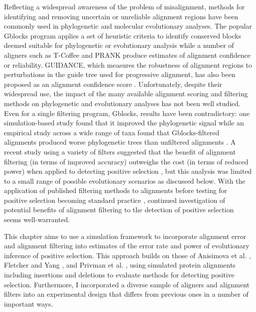 Reflecting a widespread awareness of the problem of misalignment,
methods for identifying and removing uncertain or unreliable alignment
regions have been commonly used in phylogenetic and molecular
evolutionary analyses. The popular Gblocks program applies a set of
heuristic criteria to identify conserved blocks deemed suitable for
phylogenetic or evolutionary analysis \citep{Castresana2000Selection}
while a number of aligners such as T-Coffee
\citep{Notredame2000T} and PRANK
\citep{Loytynoja2008PhylogenyAware} produce estimates of alignment
confidence or reliability. GUIDANCE, which measures the robustness of
alignment regions to perturbations in the guide tree used for
progressive alignment, has also been proposed as an alignment
confidence score \citep{Penn2010Alignment}. Unfortunately, despite
their widespread use, the impact of the many available alignment
scoring and filtering methods on phylogenetic and evolutionary
analyses has not been well studied. Even for a single filtering
program, Gblocks, results have been contradictory: one
simulation-based study found that it improved the phylogenetic signal
\citep{Talavera2007Improvement} while an empirical study across a wide
range of taxa found that Gblocks-filtered alignments produced worse
phylogenetic trees than unfiltered alignments
\citep{Dessimoz2010Phylogenetic}. A recent study using a variety of
filters suggested that the benefit of alignment filtering (in terms of
improved accuracy) outweighs the cost (in terms of reduced power) when
applied to detecting positive selection \citep{Privman2011Improving},
but this analysis was limited to a small range of possible
evolutionary scenarios as discussed below.  With the application of
published filtering methods to alignments before testing for positive
selection becoming standard practice
\citep{Studer2008,Aguileta2009Rapidly}, continued
investigation of potential benefits of alignment filtering to the
detection of positive selection seems well-warranted.

This chapter aims to use a simulation framework to incorporate
alignment error and alignment filtering into estimates of the error
rate and power of \sw evolutionary inference of positive
selection. This approach builds on those of Anisimova et al.
\citeyearpar{Anisimova2002Accuracy}, Fletcher and Yang
\citeyearpar{Fletcher2010}, and Privman et
al. \citeyearpar{Privman2011Improving}, using simulated protein
alignments including insertions and deletions to evaluate methods for
detecting \sw positive selection. Furthermore, I incorporated a
diverse sample of aligners and alignment filters into an experimental
design that differs from previous ones in a number of important ways.


